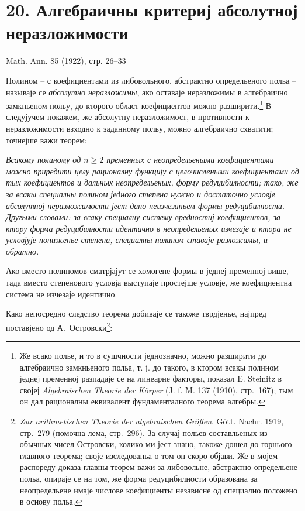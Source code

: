 ﻿\documentclass[11pt]{article}
\begin{document}

\setcounter{footnote}{0}
\section*{20. Алгебраичны критериј абсолутној неразложимости}
\begin{center}
Math. Ann. 85 (1922), стр. 26--33
\end{center}

Полином -- с коефициентами из либовольного, абстрактно определьеного польа -- называје се \emph{абсолутно неразложимы}, ако оставаје неразложимы в алгебраично замкньеном польу, до кторого област коефициентов можно разширити.\footnote{Же всако полье, и то в сушчности једнозначно, можно разширити до алгебраично замкньеного польа, т. ј. до такого, в ктором всакы полином једнеј пременној разпадаје се на линеарне факторы, показал E. Steinitz в својеј \emph{Algebraischen Theorie der Körper} (J. f. M. 137 (1910), стр.~167); тым он дал рационалны еквивалент фундаменталного теорема алгебры.} В следујучем покажем, же абсолутну неразложимост, в противности к неразложимости взходно к заданному польу, можно алгебраично схватити; точнејше важи теорем:

\emph{Всакому полиному од $n\ge2$ пременных с неопредельеными коефициентами можно приредити целу рационалну функцију с целочислеными коефициентами од тых коефициентов и дальных неопредельеных, форму редуцибилности; тако, же за всакы специалны полином једного степена нужно и достаточно условје абсолутној неразложимости јест дано неизчезаньем формы редуцибилности. Другыми словами: за всаку специалну систему вредностиј коефициентов, за ктору форма редуцибилности идентично в неопредельеных изчезаје и ктора не условјује пониженье степена, специалны полином ставаје разложимы, и обратно.}

Ако вместо полиномов сматрјајут се хомогене формы в једнеј пременној више, тада вместо степенового условја выступаје простејше условје, же коефициентна система не изчезаје идентично.

Како непосредно следство теорема добиваје се такоже тврдјенье, најпред поставјено од \mbox{А.~Островски}\footnote{\emph{Zur arithmetischen Theorie der algebraischen Größen}. Gött. Nachr. 1919, стр.~279 (помочна лема, стр.~296). За случај польев составльеных из обычных чисел Островски, колико ми јест знано, такоже дошел до горнього главного теорема; своје изследованьа о том он скоро објави. Же в мојем распореду доказа главны теорем важи за либовольне, абстрактно определьене польа, опираје се на том, же форма редуцибилности образована за неопредельене имаје числове коефициенты независне од специално положено в основу польа.}:
\end{document}
